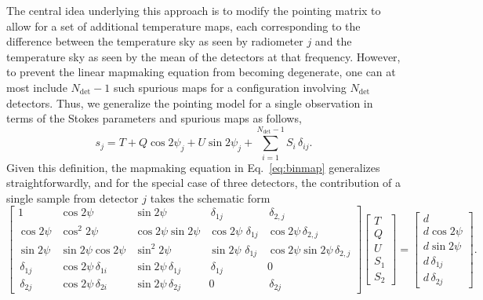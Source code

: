 \documentclass[onecolumn]{aa}
\begin{document}
The central idea underlying this approach is to modify the pointing
matrix to allow for a set of additional temperature maps, each
corresponding to the difference between the temperature sky as seen by
radiometer $j$ and the temperature sky as seen by the mean of the
detectors at that frequency. However, to prevent the linear mapmaking
equation from becoming degenerate, one can at most include
$N_{\mathrm{det}}-1$ such spurious maps for a configuration involving
$N_{\mathrm{det}}$ detectors. Thus, we generalize the pointing model
for a single observation in terms of the Stokes parameters and
spurious maps as follows,
\begin{equation}
s_{j} = T + Q\cos2\psi_j + U\sin2\psi_j +
\sum_{i=1}^{N_{\mathrm{det}}-1}S_i \,\delta_{ij}. 
\end{equation}
Given this definition, the mapmaking equation in Eq.~\eqref{eq:binmap}
generalizes straightforwardly, and for the special case of three
detectors, the contribution of a single sample from detector $j$ takes
the schematic form
{\fontsize{5.3}{4}\selectfont
\begin{equation}
  \left[\begin{array}{ccccc}
      1 & \cos 2\psi & \sin 2\psi & \,\delta_{1j} & \,\delta_{2,j} \\
      \cos 2\psi & \cos^2 2\psi & \cos 2\psi \sin 2\psi & \cos 2\psi\,
      \,\delta_{1j} & \cos 2\psi\,\delta_{2,j} \\
      \sin 2\psi & \sin 2\psi\cos 2\psi & \sin^2 2\psi & \sin 2\psi\,
      \,\delta_{1j} & \cos 2\psi\sin 2\psi\,\delta_{2,j} \\
      \,\delta_{1j} & \cos 2\psi\,\delta_{1i} & \sin 2\psi\,\delta_{1j} & \,\delta_{1j} & 0 \\
      \,\delta_{2j} & \cos 2\psi\,\delta_{2i} & \sin 2\psi\,\delta_{2j} & 0 & \,\delta_{2j}
    \end{array}\right]
  \left[\begin{array}{c}
      T \\ Q \\ U \\ S_1 \\ S_2
    \end{array}\right]
  =
  \left[\begin{array}{c}
      d \\ d\cos 2\psi  \\ d\sin 2\psi  \\ d\,\delta_{1j} \\ d\,\delta_{2j}
    \end{array}\right].
  \label{eq:Smap}
\end{equation}
}\normalfont
\end{document}
